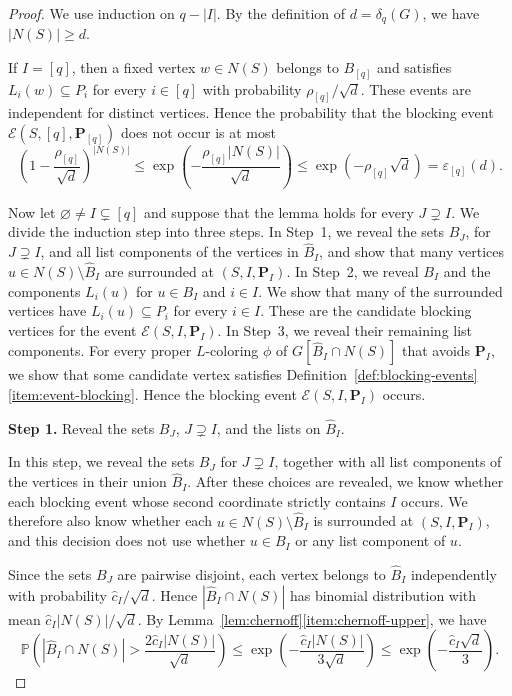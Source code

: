 \documentclass[10pt,a4paper]{amsart}
\numberwithin{equation}{section}
\newcommand{\Prob}{\mathbb{P}}
\begin{document}
\begin{proof}
We use induction on $q - |I|$. By the definition of $d = \delta_q(G)$, we have
$|N(S)| \geq d$.

If $I = [q]$, then a fixed vertex $w \in N(S)$ belongs to $B_{[q]}$ and
satisfies $L_i(w) \subseteq P_i$ for every $i \in [q]$ with probability
$\rho_{[q]}/\sqrt d$. These events are independent for distinct vertices.
Hence the probability that the blocking event
$\mathcal{E}(S,[q],\mathbf{P}_{[q]})$ does not occur is at most
\[
 \left(1 - \frac{\rho_{[q]}}{\sqrt d}\right)^{|N(S)|}
 \leq \exp\left(-\frac{\rho_{[q]}|N(S)|}{\sqrt d}\right)
 \leq \exp(-\rho_{[q]}\sqrt{d})
 = \varepsilon_{[q]}(d).
\]

Now let $\varnothing \ne I \subsetneq [q]$ and suppose that the lemma holds
for every $J \supsetneq I$.
We divide the induction step into three steps. In Step~1, we reveal the sets
$B_J$, for $J \supsetneq I$, and all list components of the vertices in
$\hat{B}_{I}$, and show that many vertices
$u \in N(S) \setminus \hat{B}_{I}$ are surrounded at $(S,I,\mathbf{P}_I)$. In
Step~2, we reveal $B_I$ and the components $L_i(u)$ for $u\in B_I$ and
$i\in I$. We show that many of the surrounded vertices have
$L_i(u) \subseteq P_i$ for every $i \in I$. These are the candidate blocking vertices
for the event
$\mathcal{E}(S,I,\mathbf{P}_I)$. In Step~3, we reveal their remaining list
components. For every proper $L$-coloring $\phi$ of
$G[\hat{B}_{I} \cap N(S)]$ that avoids $\mathbf{P}_I$, we show that some
candidate vertex satisfies Definition~\ref{def:blocking-events}%
\ref{item:event-blocking}. Hence the blocking event
$\mathcal{E}(S,I,\mathbf{P}_I)$ occurs.

\medskip
\noindent
\textbf{Step 1.} Reveal the sets $B_J$, $J \supsetneq I$, and the lists on
$\hat{B}_{I}$.\par\nobreak
\medskip

In this step, we reveal the sets $B_J$ for $J \supsetneq I$,
together with all list components of the vertices in their union
$\hat{B}_{I}$. After these choices are revealed, we know whether each blocking
event whose second coordinate strictly contains $I$ occurs. We therefore also
know whether each $u \in N(S) \setminus \hat{B}_{I}$ is surrounded at
$(S,I,\mathbf{P}_I)$, and this decision does not use whether $u \in B_I$ or any
list component of $u$.

Since the sets $B_J$ are pairwise disjoint, each vertex belongs to
$\hat{B}_{I}$ independently with probability $\hat{c}_{I}/\sqrt{d}$.
Hence $|\hat{B}_{I} \cap N(S)|$ has binomial distribution with mean
$\hat{c}_{I}|N(S)|/\sqrt{d}$.
By Lemma~\ref{lem:chernoff}\ref{item:chernoff-upper}, we have
\begin{equation}\label{eq:upper-tail}
 \Prob\left(
 |\hat{B}_{I} \cap N(S)| > \frac{2\hat{c}_{I}|N(S)|}{\sqrt{d}}
 \right)
 \leq \exp\left(-\frac{\hat{c}_{I}|N(S)|}{3\sqrt{d}}\right)
 \leq \exp\left(-\frac{\hat{c}_{I}\sqrt{d}}{3}\right).
\end{equation}


\end{proof}
\end{document}
